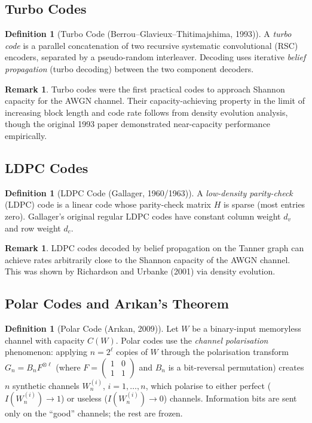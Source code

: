 \documentclass[12pt,a4paper]{amsart}
\theoremstyle{definition}
\newtheorem{definition}[theorem]{Definition}
\newtheorem{remark}[theorem]{Remark}
\theoremstyle{remark}
\begin{document}
\subsection{Turbo Codes}

\begin{definition}[Turbo Code (Berrou--Glavieux--Thitimajshima, 1993)]
A \emph{turbo code} is a parallel concatenation of two recursive systematic
convolutional (RSC) encoders, separated by a pseudo-random interleaver. Decoding
uses iterative \emph{belief propagation} (turbo decoding) between the two
component decoders.
\end{definition}

\begin{remark}
Turbo codes were the first practical codes to approach Shannon capacity for the
AWGN channel. Their capacity-achieving property in the limit of increasing block
length and code rate follows from density evolution analysis, though the original
1993 paper demonstrated near-capacity performance empirically.
\end{remark}

\subsection{LDPC Codes}

\begin{definition}[LDPC Code (Gallager, 1960/1963)]
A \emph{low-density parity-check} (LDPC) code is a linear code whose parity-check
matrix $H$ is sparse (most entries zero). Gallager's original regular LDPC codes
have constant column weight $d_v$ and row weight $d_c$.
\end{definition}

\begin{remark}
LDPC codes decoded by belief propagation on the Tanner graph can achieve rates
arbitrarily close to the Shannon capacity of the AWGN channel. This was shown
by Richardson and Urbanke (2001) via density evolution.
\end{remark}

\subsection{Polar Codes and Ar\i{}kan's Theorem}

\begin{definition}[Polar Code (Ar\i{}kan, 2009)]
Let $W$ be a binary-input memoryless channel with capacity $C(W)$. Polar codes
use the \emph{channel polarisation} phenomenon: applying $n = 2^\ell$ copies of
$W$ through the polarisation transform $G_n = B_n F^{\otimes \ell}$ (where
$F = \begin{pmatrix}1&0\\1&1\end{pmatrix}$ and $B_n$ is a bit-reversal permutation)
creates $n$ synthetic channels $W_n^{(i)}$, $i = 1, \ldots, n$, which polarise
to either perfect ($I(W_n^{(i)}) \to 1$) or useless ($I(W_n^{(i)}) \to 0$) channels.
Information bits are sent only on the ``good'' channels; the rest are frozen.
\end{definition}
\end{document}
